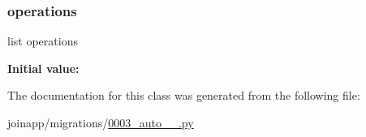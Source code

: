 \subsubsection{\texorpdfstring{operations}{operations}}
{\footnotesize\ttfamily list operations\hspace{0.3cm}{\ttfamily [static]}}

{\bfseries Initial value\+:}
\begin{DoxyCode}{0}
\DoxyCodeLine{=  [}
\DoxyCodeLine{        ),}
\DoxyCodeLine{    ]}

\end{DoxyCode}


The documentation for this class was generated from the following file\+:\begin{DoxyCompactItemize}
\item 
joinapp/migrations/\mbox{\hyperlink{0003__auto__20190605__1445_8py}{0003\+\_\+auto\+\_\+\_.\+py}}\end{DoxyCompactItemize}
